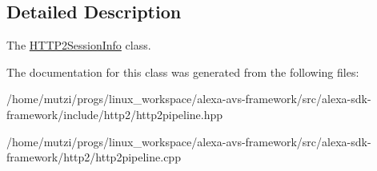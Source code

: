 \subsection{Detailed Description}
The \hyperlink{classhttp2_1_1HTTP2SessionInfo}{H\+T\+T\+P2\+Session\+Info} class. 

The documentation for this class was generated from the following files\+:\begin{DoxyCompactItemize}
\item 
/home/mutzi/progs/linux\+\_\+workspace/alexa-\/avs-\/framework/src/alexa-\/sdk-\/framework/include/http2/http2pipeline.\+hpp\item 
/home/mutzi/progs/linux\+\_\+workspace/alexa-\/avs-\/framework/src/alexa-\/sdk-\/framework/http2/http2pipeline.\+cpp\end{DoxyCompactItemize}
